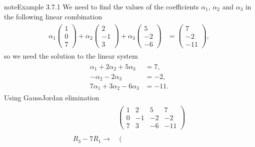 \documentclass[letterpaper,10pt,english]{jupyterBook}
\begin{document}
\begin{sphinxadmonition}{note}{Example 3.7.1}
\sphinxAtStartPar
We need to find the values of the coefficients \(\alpha_1\), \(\alpha_2\) and \(\alpha_3\) in the following linear combination
\begin{equation*}
\begin{split} \begin{align*}
    \alpha_1 \begin{pmatrix} 1 \\ 0 \\ 7 \end{pmatrix}
    + \alpha_2 \begin{pmatrix} 2 \\ -1 \\ 3 \end{pmatrix}
    + \alpha_3 \begin{pmatrix} 5 \\ -2 \\ -6 \end{pmatrix}
    &= \begin{pmatrix} 7 \\ -2 \\ -11 \end{pmatrix},
\end{align*} \end{split}
\end{equation*}
\sphinxAtStartPar
so we need the solution to the linear system
\begin{equation*}
\begin{split} \begin{align*}
    \alpha_1 + 2\alpha_2 + 5\alpha_3 &= 7, \\
    -\alpha_2 - 2\alpha_3 &= -2, \\
    7\alpha_1 + 3\alpha_2 - 6\alpha_3 &= -11.
\end{align*} \end{split}
\end{equation*}
\sphinxAtStartPar
Using Gauss\sphinxhyphen{}Jordan elimination
\begin{equation*}
\begin{split} \begin{align*}
    &\left( \begin{array}{ccc|c}
        1 & 2 & 5 & 7 \\
        0 & -1 & -2 & -2 \\
        7 & 3 & -6 & -11
    \end{array} \right)
    \\ \\
     R_3 - 7R_1 \longrightarrow &
    \left( \begin{array}{ccc|c}

\end{array}
\end{align*}
\end{split}
\end{equation*}
\end{sphinxadmonition}
\end{document}
